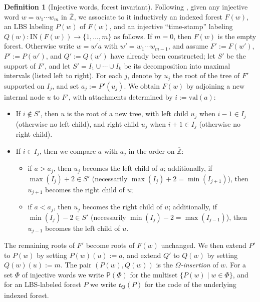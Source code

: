 \documentclass{amsart}
\theoremstyle{definition}
\newtheorem{definition}[lemma]{Definition}
\theoremstyle{remark}
\numberwithin{equation}{subsection}
\newcommand{\code}{\mathfrak{c}}
\newcommand{\forest}{\mathfrak{P}}
\begin{document}
\begin{definition}[Injective words, forest invariant]
Following \cite{nadeau2024forest}, given any injective word $w = w_1\cdots w_m$ in $\overline{\mathbb{Z}}$, we associate to it inductively an indexed forest $F(w)$, an LBS labeling $P(w)$ of $F(w)$, and an injective ``time-stamp'' labeling $Q(w):\mathrm{IN}(F(w))\to\{1,\ldots,m\}$ as follows. If $m=0$, then $F(w)$ is the empty forest. Otherwise write $w = w'a$ with $w' = w_1\cdots w_{m-1}$, and assume $F' := F(w')$, $P' := P(w')$, and $Q' := Q(w')$ have already been constructed; let $S'$ be the support of $F'$, and let $S' = I_1\cup\cdots\cup I_k$ be its decomposition into maximal intervals (listed left to right). For each $j$, denote by $u_j$ the root of the tree of $F'$ supported on $I_j$, and set $a_j := P'(u_j)$. We obtain $F(w)$ by adjoining a new internal node $u$ to $F'$, with attachments determined by $i := \mathrm{val}(a)$:
\begin{itemize}
\item If $i\notin S'$, then $u$ is the root of a new tree, with left child $u_j$ when $i-1\in I_j$ (otherwise no left child), and right child $u_j$ when $i+1\in I_j$ (otherwise no right child).
\item If $i\in I_j$, then we compare $a$ with $a_j$ in the order on $\overline{\mathbb{Z}}$:
\begin{itemize}
\item if $a>a_j$, then $u_j$ becomes the left child of $u$; additionally, if $\max(I_j)+2\in S'$ (necessarily $\max(I_j)+2 = \min(I_{j+1})$), then $u_{j+1}$ becomes the right child of $u$;
\item if $a<a_j$, then $u_j$ becomes the right child of $u$; additionally, if $\min(I_j)-2\in S'$ (necessarily $\min(I_j)-2=\max(I_{j-1})$), then $u_{j-1}$ becomes the left child of $u$.
\end{itemize}
\end{itemize}
The remaining roots of $F'$ become roots of $F(w)$ unchanged. We then extend $P'$ to $P(w)$ by setting $P(w)(u) := a$, and extend $Q'$ to $Q(w)$ by setting $Q(w)(u) := m$. The pair $(P(w), Q(w))$ is the \emph{$\Omega$-insertion} of $w$. For a set $\Phi$ of injective words we write $\mathsf{P}(\Phi)$ for the multiset $\{P(w)\mid w\in\Phi\}$, and for an LBS-labeled forest $P$ we write $\code_\forest(P)$ for the code of the underlying indexed forest.
\end{definition}
\end{document}
